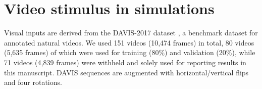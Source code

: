 \documentclass{article}
\def\eg{{\it e.g.}}
\def\R{\mathbb{R}}
\def\vrest{V^{\mathrm{rest}}}
\def\relu{\mathrm{ReLU}}
\begin{document}






\section{Video stimulus in simulations}
\label{app:stimulus}
Visual inputs are derived from the DAVIS-2017 dataset
\citep{Pont-Tuset_arXiv_2017}, a benchmark dataset for annotated natural
videos. We used 151 videos (10{,}474 frames) in total, 80 videos
(5{,}635 frames) of which were used for training (80\%) and validation
(20\%), while 71 videos (4{,}839 frames) were withheld and solely used
for reporting results in this manuscript. DAVIS sequences are augmented
with horizontal/vertical flips and four rotations.
\end{document}
